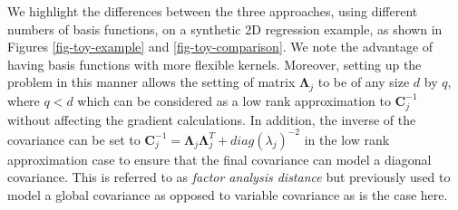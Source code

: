 \documentclass[useAMS,usenatbib,fleqn]{mn2e}
\newcommand{\bm}[1]{\mathbf{#1} }
\begin{document}
We highlight the differences between the three approaches, using different numbers of basis functions, on a synthetic 2D regression example, as shown in Figures \ref{fig-toy-example} and \ref{fig-toy-comparison}. We note the advantage of having basis functions with more flexible kernels. Moreover, setting up the problem in this manner allows the setting of matrix $\bm{\Lambda}_{j}$ to be of any size $d$ by $q$, where $q<d$ which can be considered as a low rank approximation to $\bm{C}_{j}^{-1}$ without affecting the gradient calculations. In addition, the inverse of the covariance can be set to  $\bm{C}_{j}^{-1}=\bm{\Lambda}_{j}\bm{\Lambda}_{j}^{T}+diag(\lambda_{j})^{-2}$ in the low rank approximation case to ensure that the final covariance can model a diagonal covariance. This is referred to as \emph{factor analysis distance} \citep[p. 107]{rasmussen2006gaussian} but previously used to model a global covariance as opposed to variable covariance as is the case here.
\end{document}
